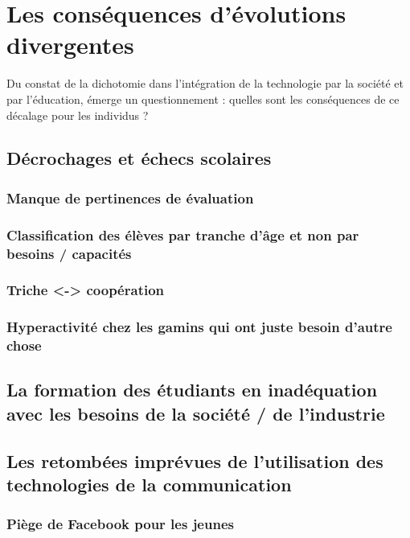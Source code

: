 
\chapter{Les conséquences d'évolutions divergentes}
Du constat de la dichotomie dans l'intégration de la technologie par la société et par l'éducation, émerge un questionnement : quelles sont les conséquences de ce décalage pour les individus ?



\section{Décrochages et échecs scolaires}

\subsection{Manque de pertinences de évaluation}
\subsection{Classification des élèves par tranche d'âge et non par besoins / capacités}
\subsection{Triche <-> coopération}
\subsection{Hyperactivité chez les gamins qui ont juste besoin d'autre chose}

\section{La formation des étudiants en inadéquation avec les besoins de la société / de l'industrie}


\section{Les retombées imprévues de l'utilisation des technologies de la communication}

\subsection{Piège de Facebook pour les jeunes}

